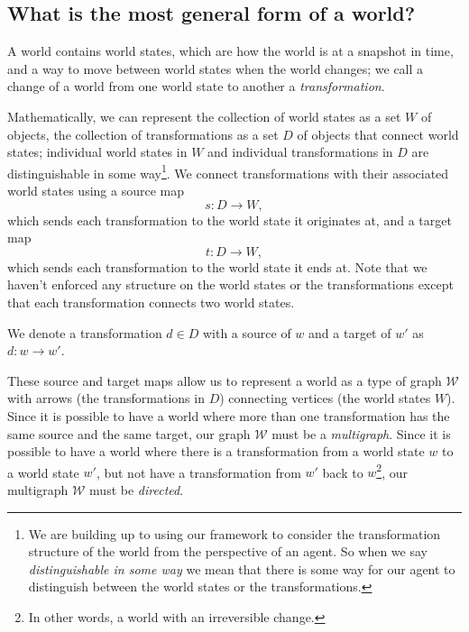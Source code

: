 \subsection{What is the most general form of a world?}
A world contains world states, which are how the world is at a snapshot in time, and a way to move between world states when the world changes; we call a change of a world from one world state to another a \emph{transformation}.

Mathematically, we can represent the collection of world states as a set $W$ of objects, the collection of transformations as a set $D$ of objects that connect world states; individual world states in $W$ and individual transformations in $D$ are distinguishable in some way\footnote{
We are building up to using our framework to consider the transformation structure of the world from the perspective of an agent. So when we say \emph{distinguishable in some way} we mean that there is some way for our agent to distinguish between the world states or the transformations.
}.
We connect transformations with their associated world states using a source map
\begin{equation}
	s: D \to W,
\end{equation}
which sends each transformation to the world state it originates at, and a target map
\begin{equation}
	t: D \to W,
\end{equation}
which sends each transformation to the world state it ends at.
Note that we haven't enforced any structure on the world states or the transformations except that each transformation connects two world states.

\begin{definition}
	We denote a transformation $d \in D$ with a source of $w$ and a target of $w'$ as $d: w \to w'$.
\end{definition}

These source and target maps allow us to represent a world as a type of graph $\mathscr{W}$ with arrows (the transformations in $D$) connecting vertices (the world states $W$).
Since it is possible to have a world where more than one transformation has the same source and the same target, our graph $\mathscr{W}$ must be a \emph{multigraph}.
Since it is possible to have a world where there is a transformation from a world state $w$ to a world state $w'$, but not have a transformation from $w'$ back to $w$\footnote{In other words, a world with an irreversible change.}, our multigraph $\mathscr{W}$ must be \emph{directed}.

